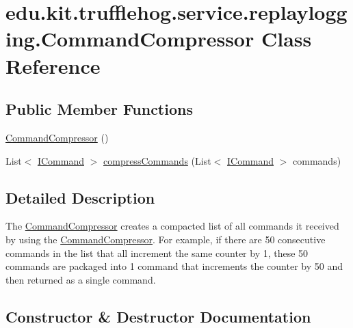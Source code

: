 \hypertarget{classedu_1_1kit_1_1trufflehog_1_1service_1_1replaylogging_1_1_command_compressor}{}\section{edu.\+kit.\+trufflehog.\+service.\+replaylogging.\+Command\+Compressor Class Reference}
\label{classedu_1_1kit_1_1trufflehog_1_1service_1_1replaylogging_1_1_command_compressor}
\subsection*{Public Member Functions}
\begin{DoxyCompactItemize}
\item 
\hyperlink{classedu_1_1kit_1_1trufflehog_1_1service_1_1replaylogging_1_1_command_compressor_af68600aecab5ef89ac97343c18f36144}{Command\+Compressor} ()
\item 
List$<$ \hyperlink{interfaceedu_1_1kit_1_1trufflehog_1_1command_1_1_i_command}{I\+Command} $>$ \hyperlink{classedu_1_1kit_1_1trufflehog_1_1service_1_1replaylogging_1_1_command_compressor_a8d84702fcf9363ccdf6fbbbf1c874836}{compress\+Commands} (List$<$ \hyperlink{interfaceedu_1_1kit_1_1trufflehog_1_1command_1_1_i_command}{I\+Command} $>$ commands)
\end{DoxyCompactItemize}


\subsection{Detailed Description}
The \hyperlink{classedu_1_1kit_1_1trufflehog_1_1service_1_1replaylogging_1_1_command_compressor}{Command\+Compressor} creates a compacted list of all commands it received by using the \hyperlink{classedu_1_1kit_1_1trufflehog_1_1service_1_1replaylogging_1_1_command_compressor}{Command\+Compressor}. For example, if there are 50 consecutive commands in the list that all increment the same counter by 1, these 50 commands are packaged into 1 command that increments the counter by 50 and then returned as a single command. 

\subsection{Constructor \& Destructor Documentation}
\hypertarget{classedu_1_1kit_1_1trufflehog_1_1service_1_1replaylogging_1_1_command_compressor_af68600aecab5ef89ac97343c18f36144}{}
